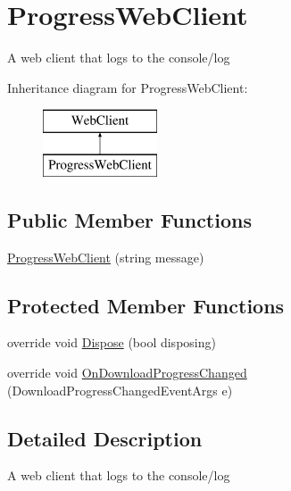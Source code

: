 \hypertarget{classOTA_1_1Misc_1_1ProgressWebClient}{}\section{Progress\+Web\+Client}
\label{classOTA_1_1Misc_1_1ProgressWebClient}


A web client that logs to the console/log  


Inheritance diagram for Progress\+Web\+Client\+:\begin{figure}[H]
\begin{center}
\leavevmode
\includegraphics[height=2.000000cm]{classOTA_1_1Misc_1_1ProgressWebClient}
\end{center}
\end{figure}
\subsection*{Public Member Functions}
\begin{DoxyCompactItemize}
\item 
\hyperlink{classOTA_1_1Misc_1_1ProgressWebClient_ade8c18ed95e0fa2fd78debeb24d48089}{Progress\+Web\+Client} (string message)
\end{DoxyCompactItemize}
\subsection*{Protected Member Functions}
\begin{DoxyCompactItemize}
\item 
override void \hyperlink{classOTA_1_1Misc_1_1ProgressWebClient_a849c3c7f8d08104f0cdb46bee9fe6389}{Dispose} (bool disposing)
\item 
override void \hyperlink{classOTA_1_1Misc_1_1ProgressWebClient_a83b263b65219649038a96d796c5607c6}{On\+Download\+Progress\+Changed} (Download\+Progress\+Changed\+Event\+Args e)
\end{DoxyCompactItemize}


\subsection{Detailed Description}
A web client that logs to the console/log 



